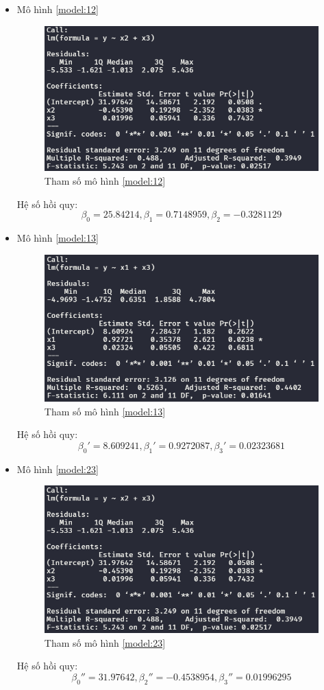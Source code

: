 \documentclass[a4paper]{article}
\theoremstyle{nonumberplain}
\begin{document}
\begin{itemize}
	\item Mô hình \ref{model:12}
	\begin{figure}[h]
		\centering
		\includegraphics[width=0.7\linewidth]{bai-3-5-model-1}
		\caption{Tham số mô hình \ref{model:12}}
		\label{fig:bai-3-5-model-1}
	\end{figure}
	
	Hệ số hồi quy:
	\[\beta_0=25.84214, \beta_1=0.7148959, \beta_2=-0.3281129\]
	
	\item Mô hình \ref{model:13}
	\begin{figure}[h]
		\centering
		\includegraphics[width=0.7\linewidth]{bai-3-5-model-2}
		\caption{Tham số mô hình \ref{model:13}}
		\label{fig:bai-3-5-model-2}
	\end{figure}
	
	Hệ số hồi quy:
	\[\beta_0'=8.609241, \beta_1'=0.9272087, \beta_3'=0.02323681\]
	
	\item Mô hình \ref{model:23}
	\begin{figure}[h]
		\centering
		\includegraphics[width=0.7\linewidth]{bai-3-5-model-3}
		\caption{Tham số mô hình \ref{model:23}}
		\label{fig:bai-3-5-model-3}
	\end{figure}

	Hệ số hồi quy:
	\[\beta_0''=31.97642, \beta_2''=-0.4538954, \beta_3''=0.01996295\]
\end{itemize}
\end{document}
